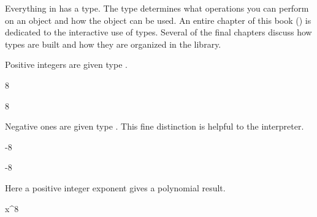 {{{{{{{%

Everything in \Language{} has a type.
The type determines what operations you can perform on an object and
how the object can be used.
An entire chapter of this book () is dedicated to
the interactive use of types.
Several of the final chapters discuss how types are built and how
they are organized in the \Language{} library.

\begin{xtc}
\begin{xtccomment}
Positive integers are given type .
\end{xtccomment}
\begin{spadsrc}
8
\end{spadsrc}
\begin{TeXOutput}
\begin{fricasmath}{1}
8%
\end{fricasmath}
\end{TeXOutput}
\end{xtc}
\begin{xtc}
\begin{xtccomment}
Negative ones are given type .
This fine distinction is helpful to the
\Language{} interpreter.
\end{xtccomment}
\begin{spadsrc}
-8
\end{spadsrc}
\begin{TeXOutput}
\begin{fricasmath}{2}
-{8}%
\end{fricasmath}
\end{TeXOutput}
\end{xtc}
\begin{xtc}
\begin{xtccomment}
Here a positive integer exponent gives a polynomial result.
\end{xtccomment}
\begin{spadsrc}
x^8
\end{spadsrc}
\begin{TeXOutput}
\begin{fricasmath}{3}
%
\end{fricasmath}
\end{TeXOutput}

\end{xtc}}}}}}}}
